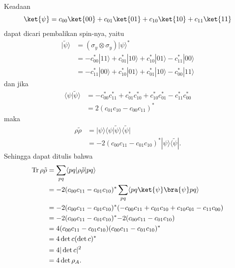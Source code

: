 \par
Keadaan
\begin{equation*}
	\ket{\psi}=c_{00}\ket{00}+c_{01}\ket{01}+c_{10}\ket{10}+c_{11}\ket{11}
\end{equation*}
dapat dicari pembalikan spin-nya, yaitu
\begin{equation}
	\begin{aligned}
		|\tilde{\psi}\rangle
		&= (\sigma_y \otimes \sigma_y)|\psi\rangle^{*}\\
		&= -c^{*}_{00}|11\rangle
		+ c^{*}_{01}|10\rangle
		+ c^{*}_{10}|01\rangle
		- c^{*}_{11}|00\rangle\\
		&= -c^{*}_{11}|00\rangle
		+ c^{*}_{10}|01\rangle
		+ c^{*}_{01}|10\rangle
		- c^{*}_{00}|11\rangle
	\end{aligned}
\end{equation}
dan jika
\begin{equation}
	\begin{aligned}
		\langle \psi | \tilde{\psi} \rangle
		&= -c^{*}_{00} c^{*}_{11}
		+ c^{*}_{01} c^{*}_{10}
		+ c^{*}_{10} c^{*}_{01}
		- c^{*}_{11} c^{*}_{00}\\
		&= 2 (c_{01} c_{10} - c_{00} c_{11})^{*}
	\end{aligned}
\end{equation}
maka
\begin{equation}
	\begin{aligned}
		\rho \tilde{\rho}
		&= |\psi\rangle \langle\psi| \tilde{\psi}\rangle \langle\tilde{\psi}|\\
		&= -2 (c_{00} c_{11} - c_{01} c_{10})^{*}
		|\psi\rangle \langle\tilde{\psi}|.
	\end{aligned}
\end{equation}
Sehingga dapat ditulis bahwa
\begin{equation}
	\begin{aligned}
		\mathrm{Tr}\,\rho \tilde{\rho}
		&= \sum_{p q} \langle p q | \rho \tilde{\rho} | p q \rangle\\
		&= -2(c_{00}c_{11}-c_{01}c_{10})^{*} \sum_{p q} \langle p q \ket{\psi}\bra{\psi} p q \rangle\\
		&=-2(c_{00} c_{11} - c_{01} c_{10})^{*}(-c_{00}c_{11}+c_{01}c_{10}+c_{10}c_{01}-c_{11}c_{00})\\
		&=-2(c_{00} c_{11} - c_{01} c_{10})^{*} {-2(c_{00} c_{11} - c_{01} c_{10})}\\
		&= 4 (c_{00} c_{11} - c_{01} c_{10})
		(c_{00} c_{11} - c_{01} c_{10})^{*}\\
		&= 4 \det c (\det c)^{*}\\
		&= 4 |\det c|^2\\
		&= 4 \det \rho_A.
	\end{aligned}
\end{equation}











